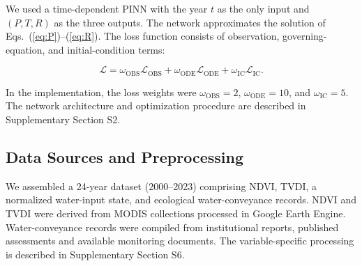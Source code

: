 \documentclass[preprint,review,12pt,3p]{elsarticle}
\begin{document}
	We used a time-dependent PINN with the year $t$ as the only input and $(P,T,R)$ as the three outputs. The network approximates the solution of Eqs.~(\ref{eq:P})--(\ref{eq:R}). The loss function consists of observation, governing-equation, and initial-condition terms:
	
	\begin{equation}
		\mathcal{L}
		=
		\omega_{\mathrm{OBS}}\mathcal{L}_{\mathrm{OBS}}
		+
		\omega_{\mathrm{ODE}}\mathcal{L}_{\mathrm{ODE}}
		+
		\omega_{\mathrm{IC}}\mathcal{L}_{\mathrm{IC}}.
	\end{equation}
	
	In the implementation, the loss weights were
	$\omega_{\mathrm{OBS}}=2$,
	$\omega_{\mathrm{ODE}}=10$, and
	$\omega_{\mathrm{IC}}=5$. The network architecture and optimization procedure are described in Supplementary Section S2.
	\subsection{Data Sources and Preprocessing}
	
	We assembled a 24-year dataset (2000--2023) comprising NDVI, TVDI, a normalized water-input state, and ecological water-conveyance records. NDVI and TVDI were derived from MODIS collections processed in Google Earth Engine. Water-conveyance records were compiled from institutional reports, published assessments and available monitoring documents. The variable-specific processing is described in Supplementary Section S6.
	
\end{document}
